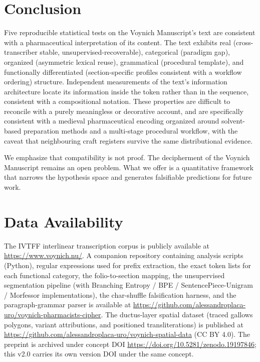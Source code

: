 \documentclass[11pt,a4paper]{article}
\begin{document}
\section{Conclusion}

Five reproducible statistical tests on the Voynich Manuscript's text are consistent with a pharmaceutical interpretation of its content. The text exhibits real (cross-transcriber stable, unsupervised-recoverable), categorical (paradigm gap), organized (asymmetric lexical reuse), grammatical (procedural template), and functionally differentiated (section-specific profiles consistent with a workflow ordering) structure. Independent measurements of the text's information architecture locate its information inside the token rather than in the sequence, consistent with a compositional notation. These properties are difficult to reconcile with a purely meaningless or decorative account, and are specifically consistent with a medieval pharmaceutical encoding organized around solvent-based preparation methods and a multi-stage procedural workflow, with the caveat that neighbouring craft registers survive the same distributional evidence.

We emphasize that compatibility is not proof. The decipherment of the Voynich Manuscript remains an open problem. What we offer is a quantitative framework that narrows the hypothesis space and generates falsifiable predictions for future work.

\section*{Data Availability}

The IVTFF interlinear transcription corpus is publicly available at \url{https://www.voynich.nu/}. A companion repository containing analysis scripts (Python), regular expressions used for prefix extraction, the exact token lists for each functional category, the folio-to-section mapping, the unsupervised segmentation pipeline (with Branching Entropy / BPE / SentencePiece-Unigram / Morfessor implementations), the char-shuffle falsification harness, and the paragraph-grammar parser is available at \url{https://github.com/alessandroplaca-uro/voynich-pharmacists-cipher}. The ductus-layer spatial dataset (traced gallows polygons, variant attributions, and positioned transliterations) is published at \url{https://github.com/alessandroplaca-uro/voynich-spatial-data} (CC BY 4.0). The preprint is archived under concept DOI \url{https://doi.org/10.5281/zenodo.19197846}; this v2.0 carries its own version DOI under the same concept.
\end{document}
